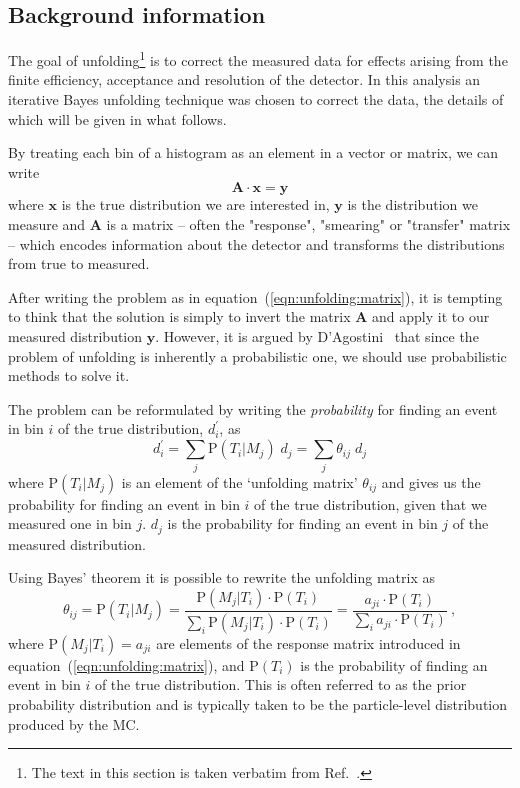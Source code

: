 \subsection{Background information}
\label{sec:gbb-unfoldingintro}

The goal of unfolding\footnote{The text in this section is taken verbatim from Ref.~\cite{ATL-COM-PHYS-2014-767}.} is to correct the measured data for effects arising from the finite efficiency, acceptance and  
resolution of the detector. In this analysis an iterative Bayes unfolding technique was chosen to correct the data, the details of which will be given in what 
follows.

By treating each bin of a histogram as an element in a vector or matrix, we can write
\begin{equation}
  \mathbf{A\cdot x} = \mathbf{y}
  \label{eqn:unfolding:matrix}
\end{equation}
where $\mathbf{x}$ is the true distribution we are interested in, $\mathbf{y}$ is the distribution we
measure and $\mathbf{A}$ is a matrix -- often the "response", "smearing" or "transfer" matrix -- which encodes information
about the detector and transforms the distributions from true to measured.

After writing the problem as in equation~(\ref{eqn:unfolding:matrix}),
it is tempting to think that the solution is simply to
invert the matrix $\mathbf{A}$ and apply it to our measured distribution $\mathbf{y}$. However,
it is argued by D'Agostini~\cite{D'Agostini:1994zf} that since the problem of unfolding is inherently a probabilistic one, we should use probabilistic methods to solve
it.

The problem can be reformulated by writing the \emph{probability} for finding an event in bin $i$ of the true distribution, $d^\prime_i$, as
\begin{equation}
  d^\prime_i = \sum_j\mathrm{P}(T_i|M_j)\;d_j  = \sum_{j}\theta_{ij}\;d_j
  \label{eqn:unfolding:unfoldingmatrix}
\end{equation}
where $\mathrm{P}(T_i|M_j)$ is an element of the `unfolding matrix' $\theta_{ij}$ and gives us the probability for finding
an event in bin $i$ of the true distribution, given that we measured one in bin $j$. $d_j$ is the probability for finding
an event in bin $j$ of the measured distribution.

Using Bayes' theorem it is possible to rewrite the unfolding matrix as
\begin{equation}
  \theta_{ij} = \mathrm{P}(T_i|M_j) = \frac{\mathrm{P}(M_j|T_i)\cdot \mathrm{P}(T_i)}{\sum_i \mathrm{P}(M_j|T_i)\cdot \mathrm{P}(T_i)} = \frac{a_{ji}\cdot \mathrm{P}(T_i)}{\sum_i a_{ji}\cdot \mathrm{P}(T_i)} \ ,
  \label{eqn:unfolding:final}
\end{equation}
where $\mathrm{P}(M_j|T_i) = a_{ji}$ are elements of the response matrix introduced in
equation~(\ref{eqn:unfolding:matrix}), and $\mathrm{P}(T_i)$ is the probability of finding an event in bin $i$ of the true distribution.
This is often referred to as the prior probability distribution and is typically taken to be the particle-level distribution produced by the MC.

